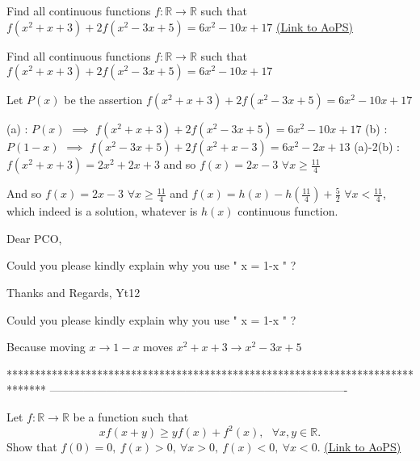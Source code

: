\begin{problem}
	Find all continuous functions $f:\mathbb{R} \rightarrow \mathbb{R}$ such that
$f(x^2+x+3)+2f(x^2-3x+5)=6x^2-10x+17$
	\flushright \href{https://artofproblemsolving.com/community/c6h608759}{(Link to AoPS)}
\end{problem}



\begin{solution}
	\begin{tcolorbox}Find all continuous functions $f:\mathbb{R} \rightarrow \mathbb{R}$ such that
$f(x^2+x+3)+2f(x^2-3x+5)=6x^2-10x+17$\end{tcolorbox}
Let $P(x)$ be the assertion $f(x^2+x+3)+2f(x^2-3x+5)=6x^2-10x+17$

(a) : $P(x)$ $\implies$ $f(x^2+x+3)+2f(x^2-3x+5)=6x^2-10x+17$
(b) : $P(1-x)$ $\implies$ $f(x^2-3x+5)+2f(x^2+x-3)=6x^2-2x+13$
(a)-2(b) : $f(x^2+x+3)=2x^2+2x+3$ and so $f(x)=2x-3$ $\forall x\ge \frac{11}4$

And so $f(x)=2x-3$ $\forall x\ge \frac{11}4$ and $f(x)=h(x)-h(\frac{11}4)+\frac 52$ $\forall x< \frac{11}4$, which indeed is a solution, whatever is $h(x)$ continuous function.
\end{solution}



\begin{solution}
	Dear PCO,

Could you please kindly explain why you use " x = 1-x " ?

Thanks and Regards,
Yt12
\end{solution}



\begin{solution}
	\begin{tcolorbox}Could you please kindly explain why you use " x = 1-x " ?\end{tcolorbox}
Because moving $x\to 1-x$ moves $x^2+x+3\to x^2-3x+5$


\end{solution}
*******************************************************************************
-------------------------------------------------------------------------------

\begin{problem}
	Let $ f : \mathbb{R} \to \mathbb{R}$ be a function such that \[\displaystyle{ xf(x+y)\geq yf(x)+f^2(x)   , \ \ \ \forall x,y \in  \mathbb{R}.  }\]
Show that $f(0)=0, \ f(x)>0, \ \forall x>0, \ f(x)<0, \ \forall x<0.$
	\flushright \href{https://artofproblemsolving.com/community/c6h608773}{(Link to AoPS)}
\end{problem}



